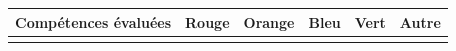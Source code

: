 \documentclass[a4paper,12pt,fleqn]{article}
\begin{document}
\begin{footnotesize}

\begin{center}

\begin{tabular}{|p{120mm}|p{8mm}|p{10mm}|p{8mm}|p{8mm}|p{8mm}|}

\hline
\textbf{Compétences évaluées} & \textbf{Rouge} & \textbf{Orange} & \textbf{Bleu} & \textbf{Vert} & \textbf{Autre} \\
\hline


\documentclass[a4paper,12pt,fleqn]{article}		




\end{tabular}
\end{center}
\end{footnotesize}
\end{document}
